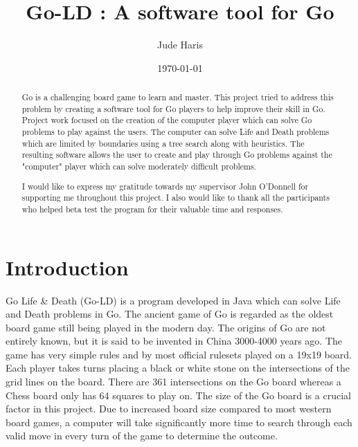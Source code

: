 \documentclass{l4proj}
\begin{document}
\title{Go-LD : A software tool for Go}
\author{Jude Haris}
\date{\today}


\maketitle

\begin{abstract}
    Go is a challenging board game to learn and master. This project tried to address this problem by creating a software tool for Go players to help improve their skill in Go. Project work focused on the creation of the computer player which can solve Go problems to play against the users. The computer can solve Life and Death problems which are limited by boundaries using a tree search along with heuristics. The resulting software allows the user to create and play through Go problems against the "computer" player which can solve moderately difficult problems.
\end{abstract}

\renewcommand{\abstractname}{Acknowledgements}
\begin{abstract}
I would like to express my gratitude towards my supervisor John O'Donnell for supporting me throughout this project. I also would like to thank all the participants who helped beta test the program for their valuable time and responses.
\end{abstract}



\def\consentname {Jude Christudas Haris}
\def\consentdate {\today}

\educationalconsent


\tableofcontents



\chapter{Introduction}

Go Life \& Death (Go-LD) is a program developed in Java which can solve Life and Death problems in Go. The ancient game of Go is regarded as the oldest board game still being played in the modern day. The origins of Go are not entirely known, but it is said to be invented in China 3000-4000 years ago. The game has very simple rules and by most official rulesets played on a 19x19 board. Each player takes turns placing a black or white stone on the intersections of the grid lines on the board. There are 361 intersections on the Go board whereas a Chess board only has 64 squares to play on. The size of the Go board is a crucial factor in this project. Due to increased board size compared to most western board games, a computer will take significantly more time to search through each valid move in every turn of the game to determine the outcome.
\end{document}
